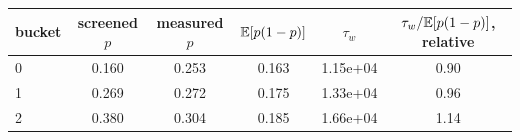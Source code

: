 \begin{tabular}{lccccc}
\toprule
bucket & screened $p$ & measured $p$ & $\mathbb{E}[p(1-p)]$ & $\tau_w$ & $\tau_w/\mathbb{E}[p(1-p)]$, relative \\
\midrule
0 & 0.160 & 0.253 & 0.163 & 1.15e+04 & 0.90 \\
1 & 0.269 & 0.272 & 0.175 & 1.33e+04 & 0.96 \\
2 & 0.380 & 0.304 & 0.185 & 1.66e+04 & 1.14 \\
\bottomrule
\end{tabular}